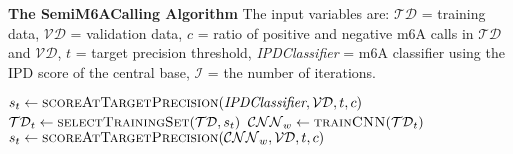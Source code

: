 \documentclass{article}
\begin{document}
\begin{algorithm}
\caption{\textbf{The SemiM6ACalling Algorithm} The input variables are: $\mathcal{TD}$ = training data, $\mathcal{VD}$ = validation data, $c$ = ratio of positive and negative m6A calls in $\mathcal{TD}$ and $\mathcal{VD}$, $t$ = target precision threshold, \textit{IPDClassifier} = m6A classifier using the IPD score of the central base, $\mathcal{I}$ = the number of iterations. }\label{alg:cap}
\begin{algorithmic}
    \State $s_t\gets\Call{\text{scoreAtTargetPrecision}}{\textit{IPDClassifier}, \mathcal{VD}, t, c}$ 
        \State $\mathcal{TD}_t\gets\Call{\text{selectTrainingSet}}{\mathcal{TD}, s_t}$ 
        \State $\mathcal{CNN}_w\gets\Call{\text{trainCNN}}{\mathcal{TD}_t}$ 
        \State $s_t\gets\Call{\text{scoreAtTargetPrecision}}{\mathcal{CNN}_w, \mathcal{VD}, t, c}$ 
    \EndFor    
    \State {}
        
\EndProcedure

\end{algorithmic}
\end{algorithm}




\end{document}
